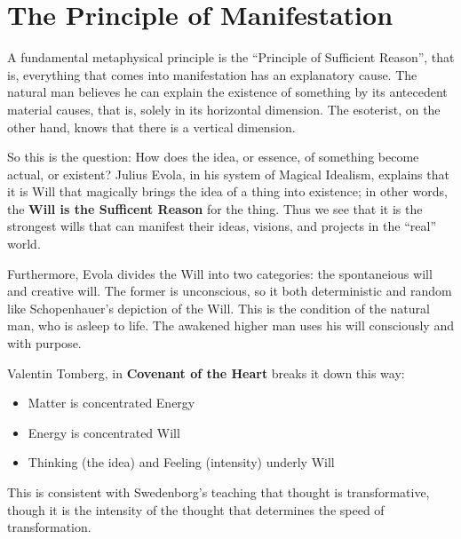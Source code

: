 \section{The Principle of Manifestation}

A fundamental metaphysical principle is the ``Principle of Sufficient Reason'', that is, everything that comes into manifestation has an explanatory cause. The natural man believes he can explain the existence of something by its antecedent material causes, that is, solely in its horizontal dimension. The esoterist, on the other hand, knows that there is a vertical dimension.

So this is the question: How does the idea, or essence, of something become actual, or existent? Julius Evola, in his system of Magical Idealism, explains that it is Will that magically brings the idea of a thing into existence; in other words, the \textbf{Will is the Sufficent Reason} for the thing. Thus we see that it is the strongest wills that can manifest their ideas, visions, and projects in the ``real'' world.

Furthermore, Evola divides the Will into two categories: the spontaneious will and creative will. The former is unconscious, so it both deterministic and random like Schopenhauer's depiction of the Will. This is the condition of the natural man, who is asleep to life. The awakened higher man uses his will consciously and with purpose.

Valentin Tomberg, in \textbf{Covenant of the Heart} breaks it down this way:

\begin{itemize}


\item Matter is concentrated Energy

\item Energy is concentrated Will

\item Thinking (the idea) and Feeling (intensity) underly Will
\end{itemize}


This is consistent with Swedenborg's teaching that thought is transformative, though it is the intensity of the thought that determines the speed of transformation.



